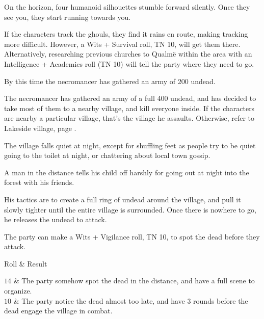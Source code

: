\begin{multicols}{2}
\begin{boxtext}

	On the horizon, four humanoid silhouettes stumble forward silently.  Once they see you, they start running towards you.

\end{boxtext}

If the characters track the ghouls, they find it rains en route, making tracking more difficult.
However, a Wits + Survival roll, TN 10, will get them there.
Alternatively, researching previous churches to Qualm\"{e} within the area with an Intelligence + Academics roll (TN 10) will tell the party where they need to go.

By this time the necromancer has gathered an army of 200 undead.


The necromancer has gathered an army of a full 400 undead, and has decided to take most of them to a nearby village, and kill everyone inside.
If the characters are nearby a particular village, that's the village he assaults.
Otherwise, refer to Lakeside village, page \pageref{lakeside}.

\begin{boxtext}
	The village falls quiet at night, except for shuffling feet as people try to be quiet going to the toilet at night, or chattering about local town gossip.

	A man in the distance tells his child off harshly for going out at night into the forest with his friends.
\end{boxtext}

His tactics are to create a full ring of undead around the village, and pull it slowly tighter until the entire village is surrounded.
Once there is nowhere to go, he releases the undead to attack.

The party can make a Wits + Vigilance roll, TN 10, to spot the dead before they attack.

\begin{rollchart}

	Roll & Result \\\hline

	$14$ & The party somehow spot the dead in the distance, and have a full scene to organize. \\

	$10$ & The party notice the dead almost too late, and have 3 rounds before the dead engage the village in combat. \\


\end{rollchart}
\end{multicols}
